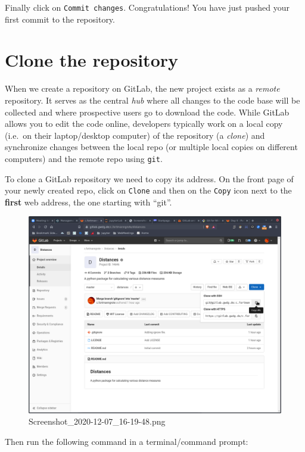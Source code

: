 \documentclass[11pt]{article}
\begin{document}
Finally click on \texttt{Commit\ changes}. Congratulations! You have
just pushed your first commit to the repository.

    \hypertarget{clone-the-repository}{%
\section{Clone the repository}\label{clone-the-repository}}

When we create a repository on GitLab, the new project exists as a
\emph{remote} repository. It serves as the central \emph{hub} where all
changes to the code base will be collected and where prospective users
go to download the code. While GitLab allows you to edit the code
online, developers typically work on a local copy (i.e.~on their
laptop/desktop computer) of the repository (a \emph{clone}) and
synchronize changes between the local repo (or multiple local copies on
different computers) and the remote repo using \texttt{git}.

To clone a GitLab repository we need to copy its address. On the front
page of your newly created repo, click on \texttt{Clone} and then on the
\texttt{Copy} icon next to the \textbf{first} web address, the one
starting with ``git''.

\begin{figure}
\centering
\includegraphics{static/clone.png}
\caption{Screenshot\_2020-12-07\_16-19-48.png}
\end{figure}

Then run the following command in a terminal/command prompt:
\end{document}
